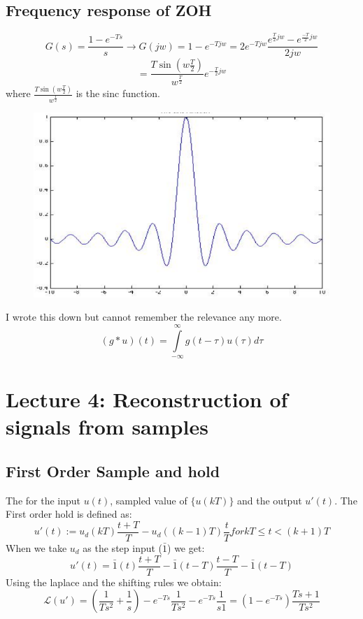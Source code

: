 \documentclass[a4paper,11pt]{article}
\begin{document}
		\subsection{Frequency response of ZOH}
		\begin{equation}
			G(s)=\frac{1-e^{-Ts}}{s}\rightarrow G(jw) = 1-e^{-Tjw}=2e^{-Tjw}\frac{e^{\frac{T}{2}jw}-e^{\frac{-T}{2}jw}}{2jw}
		\end{equation}
		\begin{equation}
			=\frac{T\sin(w\frac{T}{2})}{w^{\frac{T}{2}}}e^{-\frac{T}{2}jw}
		\end{equation}
		where $\frac{T\sin(w\frac{T}{2})}{w^{\frac{T}{2}}}$ is the sinc function.\\
		\FloatBarrier
		\begin{figure}[htp]
		\centering
		\includegraphics[scale=0.4]{images/sinc}
		\end{figure}
		
		I wrote this down but cannot remember the relevance any more.\\
		\begin{equation}
		    	(g*u)(t)=\int\limits_{-\infty}^{\infty}g(t-\tau)u(\tau)d\tau
\end{equation} 
\section{Lecture 4: Reconstruction of signals from samples}
\subsection{First Order Sample and hold}
	The for the input $u(t)$, sampled value of $\{u(kT)\}$ and the output $u'(t)$.
	The First order hold is defined as:
	\begin{equation}
		u'(t):= u_d(kT)\frac{t+T}{T}-u_d((k-1)T)\frac{t}{T} for kT \leq t < (k+1)T
	\end{equation}
	When we take $u_d$ as the step input ($\bar{1}$) we get:
	\begin{equation}
		u'(t)= \bar{1}(t)\frac{t+T}{T}-\bar{1}(t-T)\frac{t-T}{T}-\bar{1}(t-T) 
	\end{equation}
	Using the laplace and the shifting rules we obtain:
	\begin{equation}
		\mathcal{L}(u')= (\frac{1}{Ts^2}+\frac{1}{s})-e^{-Ts}\frac{1}{Ts^2}-e^{-Ts}\frac{1}{s1}= (1-e^{-Ts})\frac{Ts+1}{Ts^2}
	\end{equation}	
\end{document}
